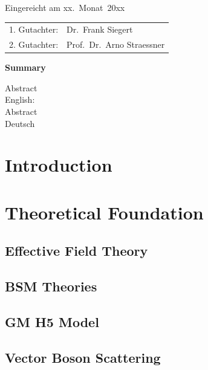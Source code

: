    
   \thispagestyle{empty}\vspace*{48em}
   
   Eingereicht am xx.~Monat~20xx\vspace{1.5em}
   \par{\large\begin{tabular}{ll}
    1. Gutachter: & Dr.~Frank Siegert \\
    2. Gutachter: & Prof.~Dr.~Arno Straessner  \\
   \end{tabular}}
   
   
   \newpage
   \begin{center}\large\bfseries Summary\end{center}
   
   
   Abstract \\ 
   English: \\
   
   \vspace{20em}
   Abstract \\ 
   Deutsch \\
    
    
\tableofcontents

\pagebreak
\chapter{Introduction}
    

\chapter{Theoretical Foundation}
    \section{Effective Field Theory}
        
        
    \section{BSM Theories}
        
    \section{GM H5 Model}
        
    

    \section{Vector Boson Scattering}
        
 
